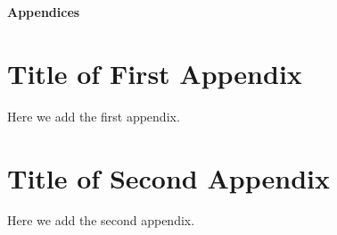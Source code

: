\documentclass[12pt,a4paper,titlepage,openany]{report}
\begin{document}

\pagestyle{fancyplain}
\vspace*{\fill}
     \begin{center}
          \bf{\Huge{Appendices}}
     \end{center}
\vspace*{\fill}
\thispagestyle{fancy}

\appendix
\thispagestyle{empty}

\chapter{Title of First Appendix}
\thispagestyle{empty}
Here we add the first appendix.


\chapter{Title of Second Appendix}
\thispagestyle{empty}
Here we add the second appendix.


\end{document}
